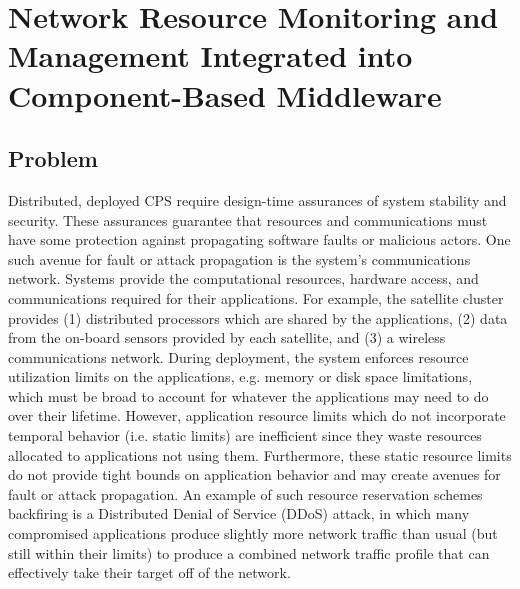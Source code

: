 \section{Network Resource Monitoring and Management Integrated into Component-Based Middleware}
\label{sec:drems}

\subsection{Problem}
Distributed, deployed CPS require design-time assurances of system
stability and security.  These assurances guarantee that resources and
communications must have some protection against propagating software
faults or malicious actors.  One such avenue for fault or attack
propagation is the system's communications network.  Systems provide
the computational resources, hardware access, and communications
required for their applications.  For example, the satellite cluster
provides (1) distributed processors which are shared by the
applications, (2) data from the on-board sensors provided by each
satellite, and (3) a wireless communications network.  During
deployment, the system enforces resource utilization limits on the
applications, e.g. memory or disk space limitations, which must be
broad to account for whatever the applications may need to do over
their lifetime.  However, application resource limits which do not
incorporate temporal behavior (i.e. static limits) are inefficient
since they waste resources allocated to applications not using them.
Furthermore, these static resource limits do not provide tight bounds
on application behavior and may create avenues for fault or attack
propagation.  An example of such resource reservation schemes
backfiring is a Distributed Denial of Service (DDoS) attack, in which
many compromised applications produce slightly more network traffic
than usual (but still within their limits) to produce a combined
network traffic profile that can effectively take their target off of
the network.

